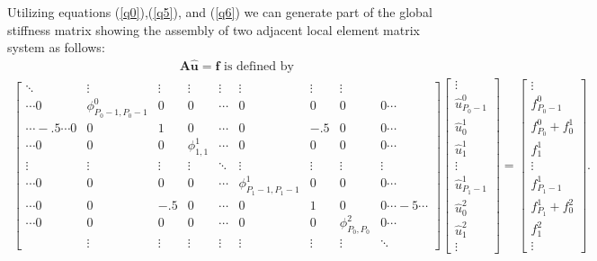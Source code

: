 Utilizing equations (\ref{q0}),(\ref{q5}), and (\ref{q6}) we can
generate part of the global stiffness matrix showing the assembly
of two adjacent local element matrix system as follows:
\begin{eqnarray}
\label{localsystem}
&{\mathbf A \mathbf{\hat u} = \mathbf f} \mbox{ is defined by }
\end{eqnarray}
\begin{eqnarray*}
\begin{bmatrix}
    \ddots &\vdots  &\vdots &\vdots &\vdots &\vdots &\vdots &\vdots & \\
    \cdots0 &\phi_{P_0-1,P_0-1}^0   & 0     & 0     &\cdots & 0     & 0     & 0     &0\cdots    \\
    \cdots-.5\cdots0 & 0    & 1     & 0     &\cdots & 0     & -.5   & 0     &0\cdots \\
    \cdots0 & 0      & 0    &\phi_{1,1}^1   &\cdots & 0     & 0     & 0     &0\cdots \\
    \vdots &\vdots  &\vdots &\vdots &\ddots &\vdots &\vdots &\vdots &\vdots  \\
    \cdots0 & 0      & 0    & 0    &\cdots  &\phi_{P_1-1,P_1-1}^1   & 0     & 0   &0\cdots \\
    \cdots0 & 0      & -.5  & 0    &\cdots  & 0     &1      & 0     & 0\cdots-5\cdots \\
    \cdots0 & 0      & 0    & 0    &\cdots  & 0     &0      &\phi_{P_0,P_0}^2   & 0\cdots \\
           &\vdots  &\vdots &\vdots &\vdots &\vdots &\vdots &\vdots &\ddots
\end{bmatrix}
\begin{bmatrix}
    \vdots      \\
    {\hat u_{P_0-1}^0}  \\
    {\hat u_0^1}\\%
    {\hat u_1^1}\\
    \vdots      \\
    {\hat u_{P_1-1}^1}  \\
    {\hat u_0^2}\\%
    {\hat u_1^2}\\
    \vdots
\end{bmatrix}
=
\begin{bmatrix}
    \vdots      \\
    f_{P_0-1}^0 \\
    f_{P_0}^0 + f_{0}^1 \\
    f_{1}^1 \\
    \vdots  \\
    f_{P_1-1}^1 \\
    f_{P_1}^1 + f_{0}^2 \\
    f_{1}^2 \\
    \vdots
\end{bmatrix}.
\end{eqnarray*}

